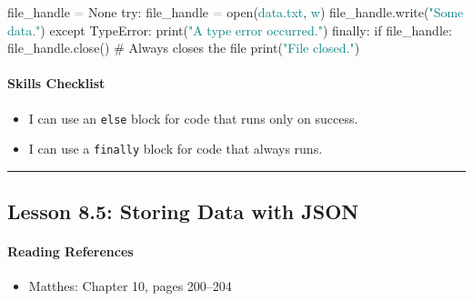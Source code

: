 \documentclass[
  justified,
  openright,
]{tufte-book}
\let\subsubsection\paragraph
\let\paragraph\paragraph
\newcommand{\BuiltInTok}[1]{#1}
\newcommand{\CommentTok}[1]{\textcolor{MidGray}{#1}}
\newcommand{\ControlFlowTok}[1]{\textcolor{BrandBlue}{#1}}
\newcommand{\NormalTok}[1]{#1}
\newcommand{\OperatorTok}[1]{\textcolor{DarkGray}{#1}}
\newcommand{\PreprocessorTok}[1]{\textcolor{BrandAccent}{#1}}
\newcommand{\StringTok}[1]{\textcolor{Teal}{#1}}
\newcommand{\VariableTok}[1]{#1}
\newenvironment{Shaded}{%
  \begin{snugshade}
}{%
  \end{snugshade}
}
\let\subsubsection\paragraph
\let\paragraph\paragraph
\providecommand{\tightlist}{%
  \setlength{\itemsep}{0pt}\setlength{\parskip}{0pt}}
\begin{document}
\begin{Shaded}
\begin{Highlighting}[]
\NormalTok{file\_handle }\OperatorTok{=} \VariableTok{None}
\ControlFlowTok{try}\NormalTok{:}
\NormalTok{    file\_handle }\OperatorTok{=} \BuiltInTok{open}\NormalTok{(}\StringTok{\textquotesingle{}data.txt\textquotesingle{}}\NormalTok{, }\StringTok{\textquotesingle{}w\textquotesingle{}}\NormalTok{)}
\NormalTok{    file\_handle.write(}\StringTok{"Some data."}\NormalTok{)}
\ControlFlowTok{except} \PreprocessorTok{TypeError}\NormalTok{:}
    \BuiltInTok{print}\NormalTok{(}\StringTok{"A type error occurred."}\NormalTok{)}
\ControlFlowTok{finally}\NormalTok{:}
    \ControlFlowTok{if}\NormalTok{ file\_handle:}
\NormalTok{        file\_handle.close()     }\CommentTok{\# Always closes the file}
        \BuiltInTok{print}\NormalTok{(}\StringTok{"File closed."}\NormalTok{)}
\end{Highlighting}
\end{Shaded}

\subsubsection{Skills Checklist}\label{skills-checklist-40}

\begin{itemize}
\tightlist
\item[$\square$]
  I can use an \texttt{else} block for code that runs only on success.
\item[$\square$]
  I can use a \texttt{finally} block for code that always runs.
\end{itemize}

\begin{center}\rule{0.5\linewidth}{0.5pt}\end{center}

\subsection{Lesson 8.5: Storing Data with
JSON}\label{lesson-8.5-storing-data-with-json}

\subsubsection{Reading References}\label{reading-references-26}

\begin{itemize}
\tightlist
\item
  Matthes: Chapter 10, pages 200--204
\end{itemize}
\end{document}
